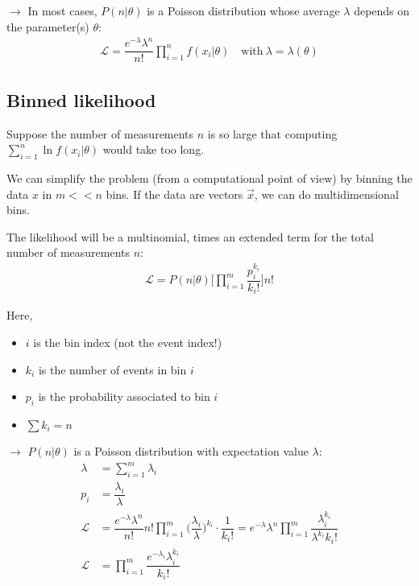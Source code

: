 $\to$ In most cases, $P(n|\theta)$ is a Poisson distribution whose average $\lambda$ depends on the parameter(s) $\theta$: 
\begin{align}
    \mathcal{L} = \dfrac{e^{-\lambda} \lambda^{n}}{n!} \prod \limits_{i=1}^{n} f(x_i|\theta) \quad \text{with} \: \lambda=\lambda(\theta)
\end{align}

\subsection{Binned likelihood} 
\label{subsec:point_estimation_binned_likelihood}
Suppose the number of measurements $n$ is so large that computing $\sum \limits_{i=1}^{n} \ln f(x_i|\theta)$ would take too long. 

We can simplify the problem (from a computational point of view) by binning the data $x$ in $m<<n$ bins. 
If the data are vectors $\vec{x}$, we can do multidimensional bins. 

The likelihood will be a multinomial, times an extended term for the total number of measurements $n$: 
\begin{align}
    \mathcal{L} = P(n|\theta) \Big [ \prod \limits_{i=1}^m \dfrac{p_i^{k_i}}{k_i!}\Big] n! 
\end{align}

Here, 
\begin{itemize}[$\to$]
    \item $i$ is the bin index (not the event index!)
    \item $k_i$ is the number of events in bin $i$
    \item $p_i$ is the probability associated to bin $i$
    \item $\sum k_i = n$
\end{itemize}

$\to$ $P(n|\theta)$ is a Poisson distribution with expectation value $\lambda$: 
\begin{align}
    \lambda &= \sum \limits_{i=1}^m \lambda_i \\
    p_i &= \dfrac{\lambda_i}{\lambda} \\
    \mathcal{L} &= \dfrac{e^{-\lambda} \lambda^n}{n!} n! \prod \limits_{i=1}^m \Big (\dfrac{\lambda_i}{\lambda} \Big )^{k_i} \cdot \dfrac{1}{k_i!} = e^{-\lambda} \lambda^n \prod \limits_{i=1}^m \dfrac{\lambda_i^{k_i}}{\lambda^{k_i}k_i!} \\
    \mathcal{L} &= \prod \limits_{i=1}^m \dfrac{e^{-\lambda_i} \lambda_i ^{k_i}}{k_i!}
\end{align}


